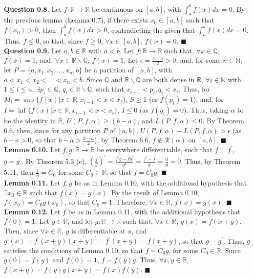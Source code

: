 \documentclass{article}
\begin{document}
\textbf{Question 0.8.} Let $f: \mathbb{R} \rightarrow \mathbb{R}$ be
continuous on $[a,b]$, with $\int_a^b f(x) dx = 0$. By the previous lemma
(Lemma 0.7), if there exists $x_0 \in [a,b]$ such that $f(x_0) > 0$, then
$\int_a^b f(x) dx > 0$, contradicting the given that $\int_a^b f(x) dx = 0$.
Thus, $f \leq 0$, so that, since $f \geq 0$, $\forall x \in [a,b]$,
$f(x) = 0$. \qquad $\blacksquare$ \\

\textbf{Question 0.9.} Let $a, b \in \mathbb{R}$ with $a < b$.
Let $f: \mathbb{R} \rightarrow \mathbb{R}$ such that,
$\forall x \in \mathbb{Q}$, $f(x) = 1$, and, $\forall x \in \mathbb{R}
\backslash \mathbb{Q}$, $f(x) = 1$. Let $\epsilon = \frac{b - a}{2} > 0$, and,
for some $n \in \mathbb{N}$, let $P = \{a, x_1, x_2, \ldots, x_n, b\}$ be a
partition of $[a,b]$, with $a < x_1 < x_2 < \ldots < x_n < b$.
Since $\mathbb{Q}$ and $\mathbb{R} \backslash \mathbb{Q}$ are both dense
in $\mathbb{R}$, $\forall i \in \mathbb{N}$ with $1 \leq i \leq n$,
$\exists p_i \in \mathbb{Q}$, $q_i \in \mathbb{R} \backslash
\mathbb{Q}$, such that $x_{i - 1} < p_i, q_i < x_i$. Thus, for $M_i = \sup
\{f(x) | x \in \mathbb{R}, x_{i - 1} < x < x_i\}$, $S \geq 1$
(as $f(p_i) = 1$), and, for $I = \inf \{f(x) | x \in \mathbb{R},
x_{i - 1} < x < x_i\}$, $I \leq 0$ (as $f(q_i) = 0$). Thus, taking $\alpha$
to be the identity in $\mathbb{R}$, $U(P,f,\alpha) \geq (b - a)$, and
$L(P,f,\alpha) \leq 0$. By Theorem 6.6, then, since for any partition $P$ of
$[a,b]$, $U(P,f,\alpha) - L(P,f,\alpha) > \epsilon$ (as $b - a > 0$, so that
$b - a > \frac{b - a}{2}$), by Theorem 6.6, $f \not \in \mathcal{R}(\alpha)$
on $[a,b]$. \qquad $\blacksquare$ \\

\textbf{Lemma 0.10.} Let $f, g: \mathbb{R} \rightarrow \mathbb{R}$ be
everywhere differentiable, such that $f = f^{\prime}$, $g = g^{\prime}$.
By Theorem 5.3 (c), $\left(\frac{f}{g}\right)^{\prime}
 = \frac{f^{\prime}g - fg^{\prime}}{g^2} = \frac{f^{\prime} - f}{g} =
\frac{0}{g} = 0$. Thus, by Theorem 5.11, then $\frac{f}{g} = C_0$ for some
$C_0 \in \mathbb{R}$, so that $f = C_0g$. \qquad $\blacksquare$ \\

\textbf{Lemma 0.11.} Let $f,g$ be as in Lemma 0.10, with the additional
hypothesis that $\exists x_0 \in \mathbb{R}$ such that $f(x) = g(x)$. By the
result of Lemma 0.10, $f(x_0) = C_0g(x_0)$, so that $C_0 = 1$. Therefore,
$\forall x \in \mathbb{R}$, $f(x) = g(x)$. \qquad $\blacksquare$ \\

\textbf{Lemma 0.12.} Let $f$ be as in Lemma 0.11, with the additional
hypothesis that $f(0) = 1$. Let $y \in \mathbb{R}$, and let $g: \mathbb{R}
\rightarrow \mathbb{R}$ such that, $\forall x \in \mathbb{R}$,
$g(x) = f(x + y)$. Then, since $\forall x \in \mathbb{R}$, $g$ is
differentiable at $x$, and $g^{\prime}(x) = f^{\prime}(x + y)(x + y)^{\prime}
 = f^{\prime}(x + y) = f(x + y)$, so that $g = g^{\prime}$. Thus, $g$
satisfies the conditions of Lemma 0.10, so that $f = C_0g$, for some
$C_0 \in \mathbb{R}$. Since $g(0) = f(y)$ and $f(0) = 1$, $f = f(y) g$. Thus,
$\forall x, y \in \mathbb{R}$, $f(x + y) = f(y)g(x + y) = f(x)f(y)$. 
\qquad $\blacksquare$ \\
\end{document}
